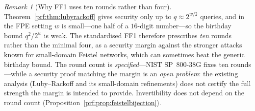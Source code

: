 \documentclass[11pt,a4paper]{article}
\theoremstyle{definition}
\theoremstyle{remark}
\newtheorem{remark}[theorem]{Remark}
\begin{document}
\begin{remark}[Why FF1 uses ten rounds rather than four]
\label{prf:rem:rounds}
Theorem~\ref{prf:thm:lubyrackoff} gives security only up to
\(q \approx 2^{w/2}\) queries, and in the FPE setting \(w\) is
small---one half of a \(16\)-digit number---so the birthday bound
\(q^{2}/2^{w}\) is weak. The standardised FF1 therefore prescribes
\emph{ten} rounds rather than the minimal four, as a security margin
against the stronger attacks known for small-domain Feistel
networks, which can sometimes beat the generic birthday bound. The
round count is \emph{specified}---NIST SP~800-38G fixes ten
rounds---while a security proof matching the margin is an \emph{open
problem}: the existing analysis (Luby--Rackoff and its small-domain
refinements) does not certify the full strength the margin is intended
to provide. Invertibility does not depend on the round count
(Proposition~\ref{prf:prop:feistelbijection}).
\end{remark}
\end{document}
